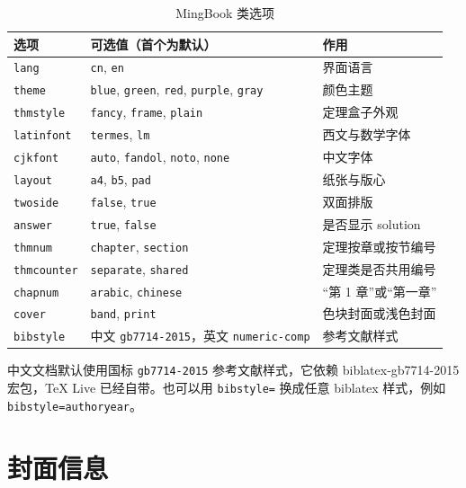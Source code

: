 \documentclass[lang=cn, theme=blue, thmstyle=fancy, twoside]{mingbook}
\begin{document}
\begin{table}[htbp]
  \centering
  \caption{MingBook 类选项}
  \label{tab:options}
  \small
  \begin{tabular}{lll}
    \toprule
    选项 & 可选值（首个为默认） & 作用 \\
    \midrule
    \texttt{lang}       & \texttt{cn}, \texttt{en} & 界面语言 \\
    \texttt{theme}      & \texttt{blue}, \texttt{green}, \texttt{red}, \texttt{purple}, \texttt{gray} & 颜色主题 \\
    \texttt{thmstyle}   & \texttt{fancy}, \texttt{frame}, \texttt{plain} & 定理盒子外观 \\
    \texttt{latinfont}  & \texttt{termes}, \texttt{lm} & 西文与数学字体 \\
    \texttt{cjkfont}    & \texttt{auto}, \texttt{fandol}, \texttt{noto}, \texttt{none} & 中文字体 \\
    \texttt{layout}     & \texttt{a4}, \texttt{b5}, \texttt{pad} & 纸张与版心 \\
    \texttt{twoside}    & \texttt{false}, \texttt{true} & 双面排版 \\
    \texttt{answer}     & \texttt{true}, \texttt{false} & 是否显示 solution \\
    \texttt{thmnum}     & \texttt{chapter}, \texttt{section} & 定理按章或按节编号 \\
    \texttt{thmcounter} & \texttt{separate}, \texttt{shared} & 定理类是否共用编号 \\
    \texttt{chapnum}    & \texttt{arabic}, \texttt{chinese} & “第 1 章”或“第一章” \\
    \texttt{cover}      & \texttt{band}, \texttt{print} & 色块封面或浅色封面 \\
    \texttt{bibstyle}   & 中文 \texttt{gb7714-2015}，英文 \texttt{numeric-comp} & 参考文献样式 \\
    \bottomrule
  \end{tabular}
\end{table}

\begin{remark}
中文文档默认使用国标 \texttt{gb7714-2015} 参考文献样式，它依赖 biblatex-gb7714-2015 宏包，\TeX{} Live 已经自带。也可以用 \texttt{bibstyle=} 换成任意 biblatex 样式，例如 \texttt{bibstyle=authoryear}。
\end{remark}

\section{封面信息}
\end{document}
